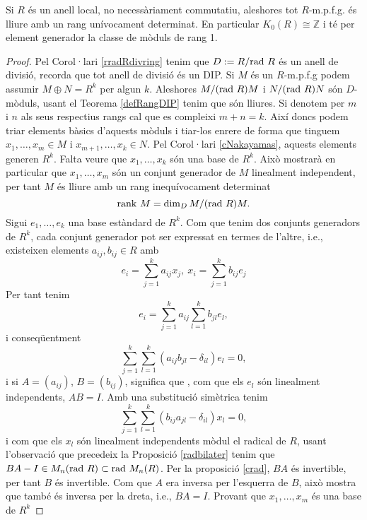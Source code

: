 \begin{theorem}
Si $R$ és un anell local, no necessàriament commutatiu, aleshores tot $R$-m.p.f.g. és lliure amb un rang unívocament determinat. En particular $K_0(R) \cong \mathbb{Z}$ i té per element generador la classe de mòduls de rang 1.
\end{theorem}
\begin{proof}
Pel Corol·lari \ref{rradRdivring} tenim que $D:=R/\mathrm{rad} \  R$ és un anell de divisió, recorda que tot anell de divisió és un DIP. Si $M$ és un $R$-m.p.f.g podem assumir $M\oplus N=R^k$ per algun $k$. Aleshores $M/(\mathrm{rad} \  R) M$ i $N/(\mathrm{rad} \  R)N$ són $D$-mòduls, usant el Teorema \ref{defRangDIP} tenim que són lliures. Si denotem per $m$ i $n$ als seus respectius rangs cal que es compleixi $m+n=k$. Així doncs podem triar elements bàsics d'aquests mòduls i tiar-los enrere de forma que tinguem $x_1,\dots , x_m\in M$ i $x_{m+1}, \dots , x_k \in N$. Pel Corol·lari \ref{cNakayamas}, aquests elements generen $R^k$. Falta veure que $x_1, \dots ,x_k$ són una base de $R^k$. Això mostrarà en particular que $x_1, \dots, x_m$ són un conjunt generador de $M$ linealment independent, per tant $M$ és lliure amb un rang inequívocament determinat
$$
\mathrm{rank} \  M  = \dim_D M / (\mathrm{rad} \  R)M.
$$
\indent Sigui $e_1,\dots , e_k$ una base estàndard de $R^k$. Com que tenim dos conjunts generadors de $R^k$, cada conjunt generador pot ser expressat en termes de l'altre, i.e., existeixen elements $a_{ij}, b_{ij}\in R$ amb 
$$
e_i = \sum_{j=1}^k a_{ij}x_j, \  x_i = \sum_{j=1}^k b_{ij}e_j
$$
Per tant tenim
$$
e_i = \sum_{j=1}^k a_{ij} \sum_{l=1}^k b_{jl}e_l,
$$
i conseqüentment
$$
\sum_{j=1}^{k} \sum_{l=1}^k (a_{ij}b_{jl}-\delta_{il})e_l=0,
$$
i si $A=(a_{ij})$, $B=(b_{ij})$, significa que , com que els $e_l$ són linealment independents, $AB=I$. Amb una substitució simètrica tenim
$$
\sum_{j=1}^{k} \sum_{l=1}^k (b_{ij}a_{jl}-\delta_{il})x_l=0,
$$
i com que els $x_l$ són linealment independents mòdul el radical de $R$, usant l'observació que precedeix la Proposició \ref{radbilater} tenim que $BA-I \in M_n (\mathrm{rad} \  R) \subset \mathrm{rad} \  M_n(R)$. Per la proposició \ref{crad}, $BA$ és invertible, per tant $B$ és invertible. Com que $A$ era inversa per l'esquerra de $B$, això mostra que també és inversa per la dreta, i.e., $BA=I$. Provant que $x_1,\dots,x_m$ és una base de $R^k$
\end{proof}

